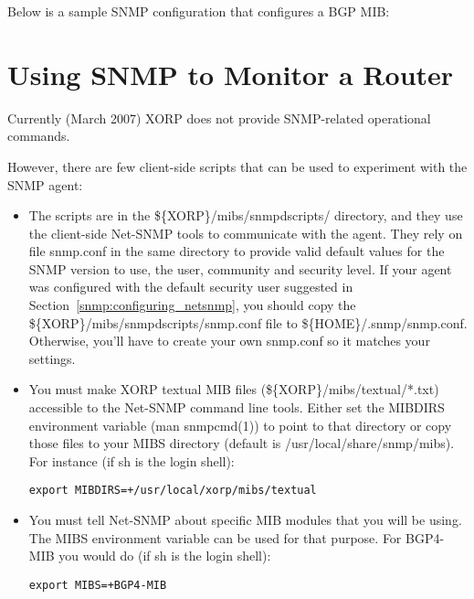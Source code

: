 Below is a sample SNMP configuration that configures a BGP MIB:

\vspace{0.1in}
\noindent{}
\vspace{0.1in}

\section{Using SNMP to Monitor a Router}

Currently (March 2007) XORP does not provide SNMP-related operational
commands.

However, there are few client-side scripts that can be used to experiment
with the SNMP agent:

\begin{itemize}
  \item The scripts are in the
  {\stt \$\{XORP\}/mibs/snmpdscripts/} directory, and they use the client-side
  Net-SNMP tools to communicate with the agent.  They rely on file
  {\stt snmp.conf} in the same directory to provide valid default values for
  the SNMP version to use, the user, community and security level. If your
  agent was configured with the default security user suggested in
  Section~\ref{snmp:configuring_netsnmp}, you should copy the
  {\stt \$\{XORP\}/mibs/snmpdscripts/snmp.conf} file to
  {\stt \$\{HOME\}/.snmp/snmp.conf}. Otherwise, you'll have to create your
  own {\stt snmp.conf} so it matches your settings.

  \item You must make XORP textual MIB files
  ({\stt \$\{XORP\}/mibs/textual/*.txt}) accessible to the Net-SNMP command
  line tools.  Either set the {\stt MIBDIRS} environment variable
  ({\stt man snmpcmd(1)}) to point to that directory or copy those files to
  your MIBS directory (default is {\stt /usr/local/share/snmp/mibs}).  For
  instance (if {\stt sh} is the login shell):

  {\tt export MIBDIRS=+/usr/local/xorp/mibs/textual}

  \item You must tell Net-SNMP about specific MIB modules that you will
  be using.  The {\stt MIBS} environment variable can be used for that
  purpose. For BGP4-MIB you would do (if {\stt sh} is the login shell):

  {\tt export MIBS=+BGP4-MIB}

\end{itemize}
